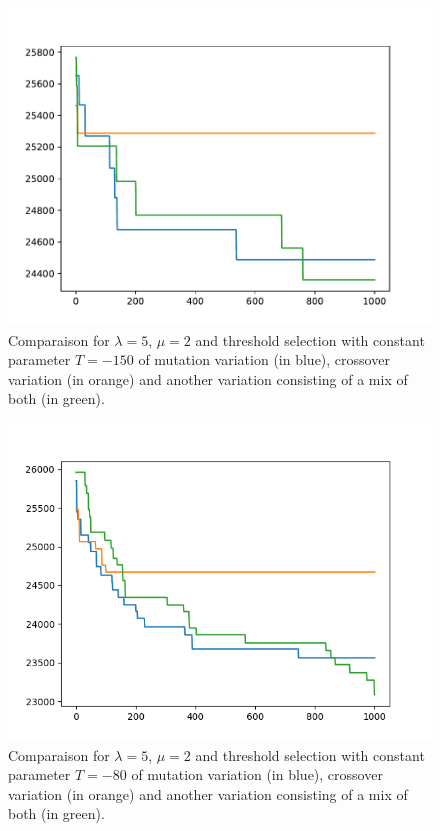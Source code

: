 \documentclass{article}
\theoremstyle{plain} %
\theoremstyle{definition} %
\begin{document}
\begin{figure}
\centering
\includegraphics[scale=.6]{../Plots/new/5,2,mutcmul,threshold-150.pdf}
\caption{Comparaison for $\lambda = 5$, $\mu = 2$ and threshold selection with
constant parameter $T = -150$ of mutation variation (in blue), crossover
variation (in orange) and another variation consisting of a mix of both (in
green).}
\label{Thresholdcomparevariation}
\end{figure}

\begin{figure}
\centering
\includegraphics[scale=.6]{../Plots/new/5,2,mutcmul,Threshold-80.png}
\caption{Comparaison for $\lambda = 5$, $\mu = 2$ and threshold selection with
constant parameter $T = -80$ of mutation variation (in blue), crossover
variation (in orange) and another variation consisting of a mix of both (in
green).}
\label{Threshold-80comparevariation}
\end{figure}
\end{document}
